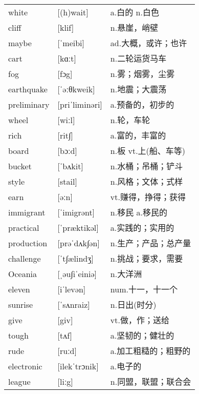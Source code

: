 \documentclass[a4paper]{article}
\begin{document}
\section{}
\begin{tabular}{l l l}

white & [(h)wait] & a.白的 n.白色 \\
cliff & [klif] & n.悬崖，峭壁 \\
maybe & [ˈmeibi] & ad.大概，或许；也许 \\
cart & [kɑːt] & n.二轮运货马车 \\
fog & [fɔg] & n.雾；烟雾，尘雾 \\
earthquake & [ˈəːθkweik] & n.地震；大震荡 \\
preliminary & [priˈliminəri] & a.预备的，初步的 \\
wheel & [wiːl] & n.轮，车轮 \\
rich & [rit∫] & a.富的，丰富的 \\
board & [bɔːd] & n.板 vt.上(船、车等) \\
bucket & [ˈbʌkit] & n.水桶；吊桶；铲斗 \\
style & [stail] & n.风格；文体；式样 \\
earn & [əːn] & vt.赚得，挣得；获得 \\
immigrant & [ˈimigrənt] & n.移民 a.移民的 \\
practical & [ˈpræktikəl] & a.实践的；实用的 \\
production & [prəˈdʌk∫ən] & n.生产；产品；总产量 \\
challenge & [ˈt∫ælindʒ] & n.挑战；要求，需要 \\
Oceania & [ˌəu∫iˈeiniə] & n.大洋洲 \\
eleven & [iˈlevən] & num.十一，十一个 \\
sunrise & [ˈsʌnraiz] & n.日出(时分) \\
give & [giv] & vt.做，作；送给 \\
tough & [tʌf] & a.坚韧的；健壮的 \\
rude & [ruːd] & a.加工粗糙的；粗野的 \\
electronic & [ilekˈtrɔnik] & a.电子的 \\
league & [liːg] & n.同盟，联盟；联合会 \\

\end{tabular}
\end{document}
